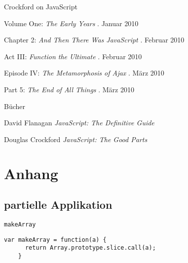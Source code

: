 \begin{frame}{Crockford on JavaScript}
  \begin{thebibliography}{1}
     Volume One:
    \emph{The Early Years}
    . Januar 2010
    
     Chapter 2:
    \emph{And Then There Was JavaScript}
    . Februar 2010
    
     Act III:
    \emph{Function the Ultimate}
    . Februar 2010
    
     Episode IV:
    \emph{The Metamorphosis of Ajax}
    . März 2010
    
     Part 5:
    \emph{The End of All Things}
    . März 2010
    
  \end{thebibliography}
\end{frame}

\begin{frame}{Bücher}
  \begin{thebibliography}{1}
     David Flanagan
    \newblock \emph{JavaScript: The Definitive Guide}
    
     Douglas Crockford
    \newblock \emph{JavaScript: The Good Parts}
  \end{thebibliography}
\end{frame}

\appendix

\section{Anhang}

\subsection{partielle Applikation}

\begin{frame}[fragile]{\texttt{makeArray}}
  \begin{lstlisting}[gobble=4]
    var makeArray = function(a) {
      return Array.prototype.slice.call(a);
    }
  \end{lstlisting}  
\end{frame}

